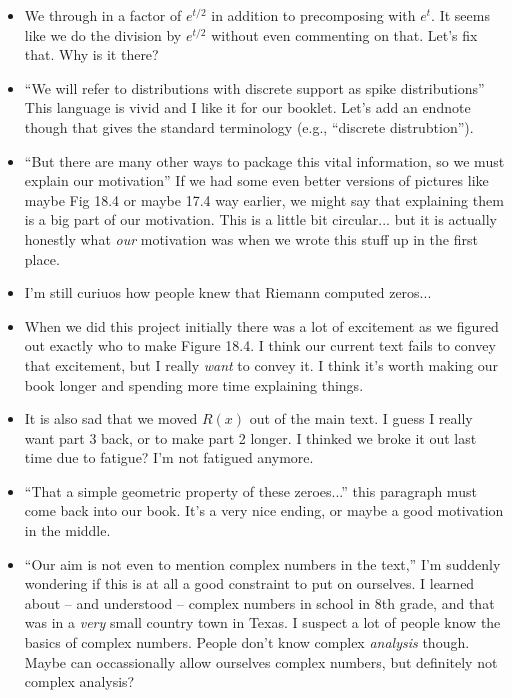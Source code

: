 \documentclass{article}
\begin{document}
\begin{itemize}
\item We through in a factor of $e^{t/2}$ in addition to precomposing
with $e^t$.  It seems like we do the division by $e^{t/2}$ without even
commenting on that.  Let's fix that.  Why is it there?

\item ``We will refer to distributions with discrete support as spike
  distributions'' This language is vivid and I like it for our
  booklet.  Let's add an endnote though that gives the standard
  terminology (e.g., ``discrete distrubtion'').

\item ``But there are many other ways to package this vital
  information, so we must explain our motivation'' If we had some even
  better versions of pictures like maybe Fig 18.4 or maybe 17.4 way
  earlier, we might say that explaining them is a big part of our
  motivation.  This is a little bit circular... but it is actually
  honestly what {\em our} motivation was when we wrote this stuff up
  in the first place.

\item I'm still curiuos how people knew that Riemann computed
zeros...

\item When we did this project initially there was a lot of excitement
  as we figured out exactly who to make Figure 18.4.  I think our
  current text fails to convey that excitement, but I really {\em
    want} to convey it.  I think it's worth making our book longer and
  spending more time explaining things.    

\item It is also sad that we moved $R(x)$ out of the main text.  I
  guess I really want part 3 back, or to make part 2 longer.  I
  thinked we broke it out last time due to fatigue?  I'm not fatigued
  anymore.

\item ``That a simple geometric property of these zeroes...'' this
  paragraph must come back into our book.  It's a very nice ending, or
  maybe a good motivation in the middle.

\item ``Our aim is not even to mention complex numbers in the text,''
  I'm suddenly wondering if this is at all a good constraint to put on
  ourselves.  I learned about -- and understood -- complex numbers in
  school in 8th grade, and that was in a {\em very} small country town
  in Texas.  I suspect a lot of people know the basics of complex
  numbers. People don't know complex {\em analysis} though.  Maybe can
  occassionally allow ourselves complex numbers, but definitely not
  complex analysis?


\end{itemize}
\end{document}
